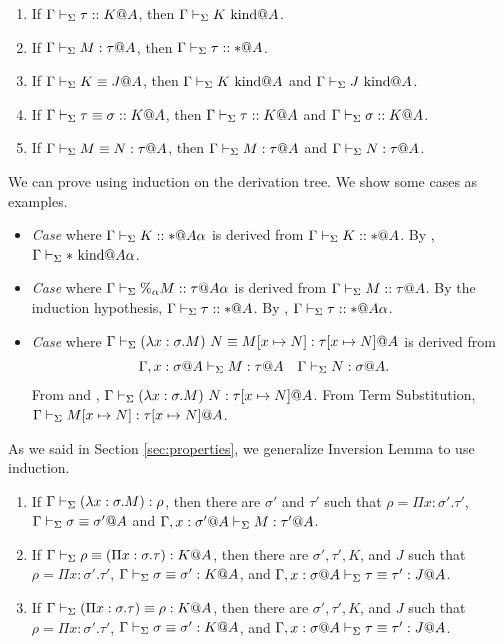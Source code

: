 \begin{lemma}[Agreement]
	\begin{enumerate}
		\item If \(\Gamma\vdash_\Sigma \tau::K@A\), then \(\G\V K\iskind@A \).
		\item If \(\G\V M:\tau@A\), then \(\Gamma\vdash_\Sigma \tau::*@A\).
		\item If \(\Gamma\vdash_\Sigma K\equiv J@A\), then \(\G\V K\iskind@A\) and \(\G\V J\iskind@A\).
		\item If \(\Gamma\vdash_\Sigma \tau\equiv \sigma :: K@A\), then \(\Gamma\vdash_\Sigma \tau::K@A\) and \(\Gamma\vdash_\Sigma \sigma::K@A\).
		\item If \(\G\V M\E N : \tau@A\), then \(\G\V M:\tau@A\) and \(\G\V N:\tau@A\).
	\end{enumerate}
\end{lemma}

We can prove using induction on the derivation tree.
We show some cases as examples.

\begin{itemize}
	\item \textit{Case} \KCsp{} where \( \Gamma \vdash_\Sigma K :: * @A\alpha \) is derived from \( \Gamma \vdash_\Sigma K :: * @A \).
	      By \WStar, \(\Gamma\vdash_\Sigma *\text{\ kind} @A\alpha\).
	\item \textit{Case} \TCsp{} where \(\Gamma\vdash_\Sigma \%_\alpha M :: \tau @A\alpha \) is derived from \(\Gamma\vdash_\Sigma M :: \tau @A \).
	      By the induction hypothesis, \( \Gamma \vdash_\Sigma \tau :: * @ A \).
	      By \KCsp, \( \Gamma \vdash_\Sigma \tau :: * @ A\alpha \).
	\item \textit{Case} \QBeta{} where \( \Gamma\vdash_\Sigma(\lambda x:\sigma.M)\ N\equiv M[x\mapsto N] : \tau[x \mapsto N]@A \) is derived from
	      \begin{align*} 
	      	  & \G,x:\sigma@A\V M:\tau@A &   & \G\V N:\sigma@A. 
	      \end{align*}
	      From \TAbs{} and \TApp, \( \Gamma\vdash_\Sigma(\lambda x:\sigma.M)\ N : \tau[x \mapsto N]@A \).
	      From Term Substitution, \( \Gamma\vdash_\Sigma M[x\mapsto N] : \tau[x \mapsto N]@A \).
\end{itemize}

As we said in Section \ref{sec:properties}, we generalize Inversion Lemma to use induction.
\begin{lemma}
\begin{enumerate}
	\item If $\Gamma \vdash_\Sigma (\lambda x:\sigma.M) : \rho$, then there are $\sigma'$ and $\tau'$ such that
	$\rho = \Pi x:\sigma'.\tau'$, $\Gamma \vdash_\Sigma \sigma \equiv \sigma'@A$ and $\Gamma ,x:\sigma'@A\vdash_\Sigma M:\tau'@A$.
	\item If $\Gamma \vdash_\Sigma \rho \equiv (\Pi x:\sigma.\tau) : K @A$, then there are $\sigma', \tau', K$, and $J$ such that
	$\rho = \Pi x:\sigma'.\tau'$, $\Gamma \vdash_\Sigma \sigma \equiv \sigma' : K @A$, and $\G, x:\sigma@A\V \tau \E \tau' : J @A$.
	\item If $\Gamma \vdash_\Sigma (\Pi x:\sigma.\tau) \equiv \rho : K @A$, then there are $\sigma', \tau', K$, and $J$ such that
	$\rho = \Pi x:\sigma'.\tau'$, $\Gamma \vdash_\Sigma \sigma \equiv \sigma' : K @A$, and $\G, x:\sigma@A\V \tau \E \tau' : J @A$.
\end{enumerate}
\end{lemma}

